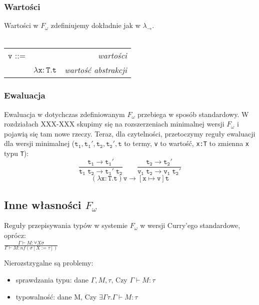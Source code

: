 \documentclass[11pt,leqno]{article}
\begin{document}
\subsubsection{Wartości}
Wartości w $F_\omega$ zdefiniujemy dokładnie jak w $\lambda_{\rightarrow}$. \\ \\
\begin{tabular}{| l c r |}
  \hline
  $\mathtt{v}$ ::= &  & \textit{wartości}  \\
   & $\mathtt{\lambda x:T.t}$ & \textit{wartość abstrakcji} \\
  \hline
\end{tabular}

\subsubsection{Ewaluacja}
Ewaluacja w dotychczas zdefiniowanym $F_\omega$ przebiega w sposób standardowy. W rozdziałach XXX-XXX skupimy się na rozszerzeniach minimalnej wersji $F_\omega$ i pojawią się tam nowe rzeczy. Teraz, dla czytelności, przetoczymy reguły ewaluacji dla wersji minimalnej ($\mathtt{t_1,t_1',t_2,t_2',t}$ to termy, \texttt{v} to wartość, \texttt{x:T} to zmienna \texttt{x} typu \texttt{T}):
	\[\mathtt{
		\frac{t_1 \longrightarrow t_1'}{t_1\;t_2 \longrightarrow t_1'\;t_2}
                \qquad
                \frac{t_2 \longrightarrow t_2'}{v_1\;t_2 \longrightarrow v_1\;t_2'}}
	\]
 	\[\mathtt{
		(\lambda x:T.t)v \longrightarrow [x \mapsto v]t}
	\]


\subsection{Inne własności $F_\omega$}

\begin{definicja}
Reguły przepisywania typów w systemie $F_{\omega}$ w wersji Curry'ego standardowe, oprócz: \\

$\frac{\Gamma \vdash M : \forall X \sigma}{\Gamma \vdash M : nf(\sigma [ X := \tau ])}$

\end{definicja}


Nierozstzygalne są problemy:
    \begin{itemize}
        \item sprawdzania typu: dane $\Gamma, M, \tau$, Czy $\Gamma \vdash M : \tau$
        \item typowalność: dane M, Czy $\exists \Gamma \tau . \Gamma \vdash M : \tau$
    \end{itemize}
\end{document}
